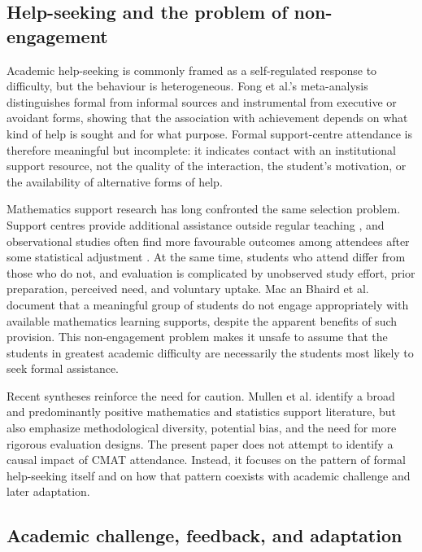 \subsection{Help-seeking and the problem of non-engagement}

Academic help-seeking is commonly framed as a self-regulated response to difficulty, but the behaviour is heterogeneous. Fong et al.'s meta-analysis \citep{fong2023} distinguishes formal from informal sources and instrumental from executive or avoidant forms, showing that the association with achievement depends on what kind of help is sought and for what purpose. Formal support-centre attendance is therefore meaningful but incomplete: it indicates contact with an institutional support resource, not the quality of the interaction, the student's motivation, or the availability of alternative forms of help.

Mathematics support research has long confronted the same selection problem. Support centres provide additional assistance outside regular teaching \citep{lawson2020,mullen2024}, and observational studies often find more favourable outcomes among attendees after some statistical adjustment \citep{macanbhaird2009,jacob2019}. At the same time, students who attend differ from those who do not, and evaluation is complicated by unobserved study effort, prior preparation, perceived need, and voluntary uptake. Mac an Bhaird et al. \citep{macanbhaird2013} document that a meaningful group of students do not engage appropriately with available mathematics learning supports, despite the apparent benefits of such provision. This non-engagement problem makes it unsafe to assume that the students in greatest academic difficulty are necessarily the students most likely to seek formal assistance.

Recent syntheses reinforce the need for caution. Mullen et al. \citep{mullen2024} identify a broad and predominantly positive mathematics and statistics support literature, but also emphasize methodological diversity, potential bias, and the need for more rigorous evaluation designs. The present paper does not attempt to identify a causal impact of CMAT attendance. Instead, it focuses on the pattern of formal help-seeking itself and on how that pattern coexists with academic challenge and later adaptation.

\subsection{Academic challenge, feedback, and adaptation}

